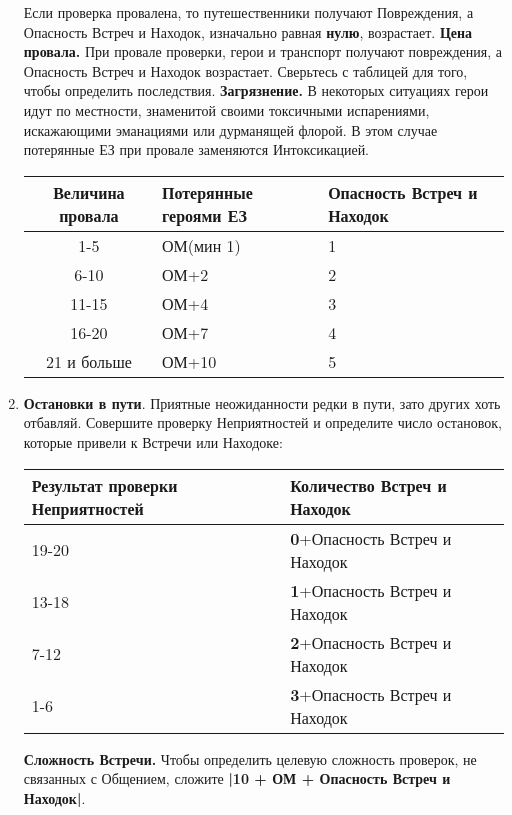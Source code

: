 \begin{enumerate}
\begin{center}
\begin{tabular}{|c|p{10cm}|}
\end{tabular}
\end{center}
Если проверка провалена, то путешественники получают Повреждения, а Опасность Встреч и Находок, изначально равная \textbf{нулю}, возрастает.
\newline \textbf{Цена провала.} При провале проверки, герои и транспорт получают повреждения, а Опасность Встреч и Находок возрастает. Сверьтесь с таблицей для того, чтобы определить последствия.
\newline \textbf{Загрязнение.} В некоторых ситуациях герои идут по местности, знаменитой своими токсичными испарениями, искажающими эманациями или дурманящей флорой. В этом случае потерянные ЕЗ при провале заменяются Интоксикацией.
\begin{center}
\begin{tabular}{|c|p{5cm}|p{5cm}|}
\hline
Величина провала & Потерянные героями ЕЗ & Опасность Встреч и Находок \\ \hline
1-5 & ОМ(мин 1) & 1 \\ \hline
6-10 & ОМ+2 & 2 \\ \hline
11-15 & ОМ+4 & 3 \\ \hline
16-20 & ОМ+7 & 4 \\ \hline
21 и больше & ОМ+10 & 5 \\ \hline
\end{tabular}
\end{center}
\item \textbf{Остановки в пути}. Приятные неожиданности редки в пути, зато других хоть отбавляй. Совершите проверку Неприятностей и определите число остановок, которые привели к Встречи или Находоке:
\begin{center}
\begin{tabular}{ |p{2.7cm}|p{12cm}| }
\hline
\textbf{Результат проверки Неприятностей} & \textbf{Количество Встреч и Находок}
\\ \hline
19-20 & \textbf{0}+Опасность Встреч и Находок
\\ \hline
13-18 & \textbf{1}+Опасность Встреч и Находок
\\ \hline
7-12 & \textbf{2}+Опасность Встреч и Находок
\\ \hline
1-6 & \textbf{3}+Опасность Встреч и Находок
\\ \hline
\end{tabular}
\end{center}
\textbf{Сложность Встречи.} Чтобы определить целевую сложность проверок, не связанных с Общением, сложите \textbf{|10 + ОМ + Опасность Встреч и Находок|}.

\end{enumerate}
